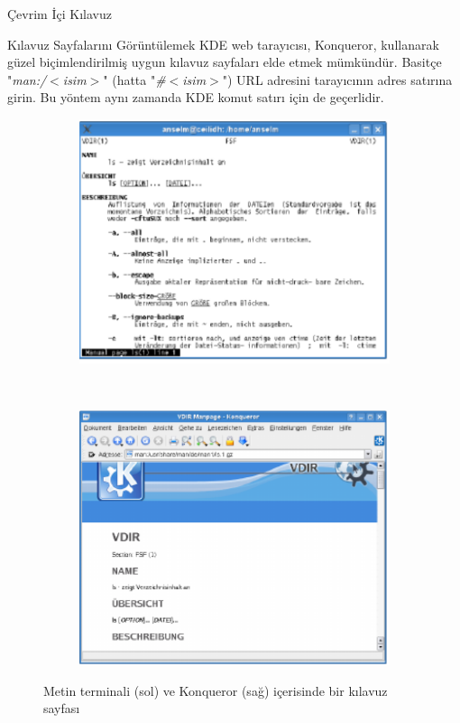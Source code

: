 \begin{section}{Çevrim İçi Kılavuz}
\begin{subsection}{Kılavuz Sayfalarını Görüntülemek}
KDE web tarayıcısı, Konqueror, kullanarak güzel biçimlendirilmiş uygun kılavuz sayfaları elde etmek mümkündür. Basitçe "\emph{man:/$<$isim$>$}" (hatta "\emph{\#$<$isim$>$}") URL adresini tarayıcının adres satırına girin. Bu yöntem aynı zamanda KDE komut satırı için de geçerlidir.

\begin{figure}
        \centering
        \begin{subfigure}[b]{0.3\textwidth}
                \centering
                \includegraphics[width=\textwidth]{./bolum5/img1}
        \end{subfigure}%
        ~ %
        \begin{subfigure}[b]{0.3\textwidth}
                \centering
                \includegraphics[width=\textwidth]{./bolum5/img2}
        \end{subfigure}
        \caption{Metin terminali (sol) ve Konqueror (sağ) içerisinde bir kılavuz sayfası }\label{fig:manpages}
\end{figure}


\end{subsection}
\end{section}
